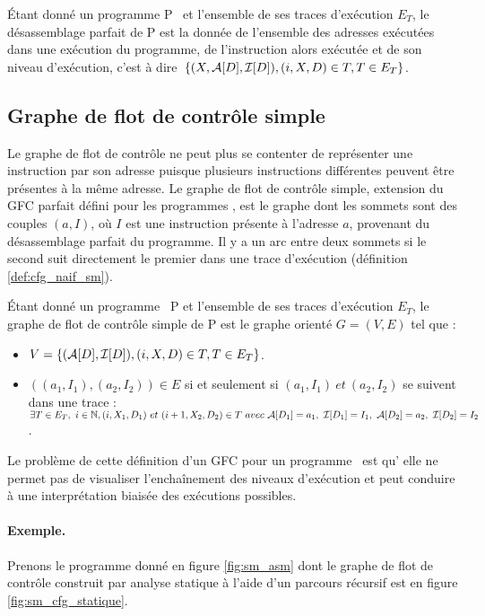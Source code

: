 \begin{defi}
 Étant donné un programme P \sm\ et l'ensemble de ses traces d'exécution
$E_T$, le désassemblage parfait de P est la donnée de l'ensemble des adresses exécutées dans une exécution du programme, de l'instruction alors exécutée et de son niveau d'exécution, c'est à dire~$\{(X, \mathcal A[D], \mathcal I[D]), (i, X, D)\in T, T\in E_T\}$.
\label{def:desassemblage_parfait_sm2}
\end{defi}

\subsection{Graphe de flot de contrôle simple}
Le graphe de flot de contrôle ne peut plus se contenter de représenter
une instruction par son adresse puisque plusieurs instructions
différentes peuvent être présentes à la même adresse.
Le graphe de flot de contrôle simple, extension du GFC parfait défini pour les programmes \nsms, est le graphe dont les sommets sont des couples $(a, I)$, où $I$ est une instruction présente à l'adresse $a$, provenant du désassemblage parfait du programme. Il y a un arc entre deux sommets si le second suit directement le premier dans une trace d'exécution (définition \ref{def:cfg_naif_sm}).

\begin{defi}
 Étant donné un programme \sm\ P et l'ensemble de ses traces d'exécution
$E_T$, le graphe de flot de contrôle simple de P est le graphe orienté
$G=(V, E)$ tel que :

 \begin{itemize}
  \item $V=\{(\mathcal A[D], \mathcal I[D]), (i, X, D)\in T, T\in E_T\}$.
  \item $((a_1, I_1), (a_2, I_2))\in E$ si et seulement si $(a_1,
I_1)\ et\ (a_2, I_2)$ se suivent dans une trace : $\exists T\in
E_T,\ i\in \BN, (i, X_1, D_1)\ et\ (i+1, X_2, D_2)\in T\ avec\
\mda{D_1}=a_1,\ \mdi{D_1}=I_1,~\mda{D_2}=a_2,\ \mdi{D_2}=I_2$.
 \end{itemize}
\label{def:cfg_naif_sm}
\end{defi}

Le problème de cette définition d'un GFC pour un programme \sm\ est qu'%
elle ne permet pas de visualiser l'enchaînement des niveaux d'exécution et peut conduire à une interprétation biaisée des exécutions possibles.

\paragraph{Exemple.}
Prenons le programme donné en figure \ref{fig:sm_asm} dont le graphe de flot de contrôle construit par analyse statique à l'aide d'un parcours récursif est en figure \ref{fig:sm_cfg_statique}.

